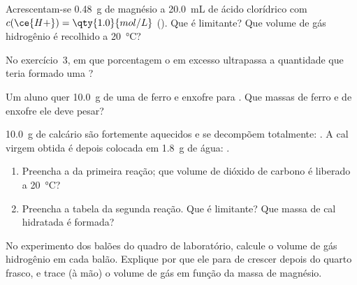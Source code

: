 \begin{exercise}[$\star\star$]\label{exo:g10:reaction-progress-table:10}
Acrescentam-se \qty{0.48}{g} de magnésio a \qty{20.0}{mL} de ácido
clorídrico com $c(\ce{H+}) = \qty{1.0}{mol/L}$
(). Que  é limitante? Que volume de
gás hidrogênio é recolhido a \qty{20}{\celsius}?
\end{exercise}

\begin{exercise}[$\star\star$]\label{exo:g10:reaction-progress-table:11}
No exercício~3, em que porcentagem o  em excesso ultrapassa a
quantidade que teria formado uma ?
\end{exercise}

\begin{exercise}[$\star\star\star$]\label{exo:g10:reaction-progress-table:12}
Um aluno quer \qty{10.0}{g} de uma  de ferro e
enxofre para . Que massas de ferro e de enxofre ele
deve pesar?
\end{exercise}

\begin{exercise}[$\star\star\star$]\label{exo:g10:reaction-progress-table:13}
\qty{10.0}{g} de calcário  são fortemente aquecidos e se
decompõem totalmente: . A cal virgem 
obtida é depois colocada em \qty{1.8}{g} de água:
.
\begin{enumerate}
  \item Preencha a  da primeira reação; que volume de
        dióxido de carbono é liberado a \qty{20}{\celsius}?
  \item Preencha a tabela da segunda reação. Que  é limitante?
        Que massa de cal hidratada  é formada?
\end{enumerate}
\end{exercise}

\begin{exercise}[$\star\star\star$]\label{exo:g10:reaction-progress-table:14}
No experimento dos balões do quadro de laboratório, calcule o volume de
gás hidrogênio em cada balão. Explique por que ele para de crescer depois
do quarto frasco, e trace (à mão) o volume de gás em função da massa de
magnésio.
\end{exercise}

